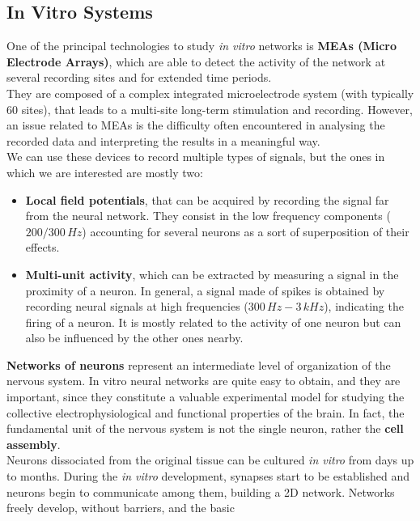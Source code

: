\subsection{In Vitro Systems}
One of the principal technologies to study \textit{in vitro} networks is
\textbf{MEAs (Micro Electrode Arrays)}, which are able to detect the
activity of the network at several recording sites and for extended time
periods.\\
They are composed of a complex integrated microelectrode system (with
typically 60 sites), that leads to a multi-site long-term stimulation and
recording.
However, an issue related to MEAs is the difficulty often encountered in
analysing the recorded data
and interpreting the results in a meaningful way.\\
We can use these devices to record multiple types of signals, but the ones
in which we are interested are mostly two:
\begin{itemize}
      \item \textbf{Local field potentials}, that can be acquired by
            recording the signal far from the neural network. They consist in the low
            frequency components (\(200/300\,Hz\)) accounting for several neurons as a sort
            of superposition of their effects.
      \item \textbf{Multi-unit activity}, which can be extracted by
            measuring a signal in the proximity of a neuron.  In general, a signal made
            of spikes is obtained by recording neural signals at high frequencies
            (\(300\,Hz-3\,kHz\)), indicating the firing of a neuron. It is mostly related to the
            activity of one neuron but can also be influenced by the other ones
            nearby.
\end{itemize}
\textbf{Networks of neurons} represent an intermediate level of
organization of the nervous system.
In vitro neural networks are quite easy to obtain, and they are important,
since they constitute a valuable experimental model for studying the
collective electrophysiological and functional properties of the brain. In
fact, the fundamental unit of the nervous system is not the single neuron,
rather the \textbf{cell assembly}.\\
Neurons dissociated from the original tissue can be cultured \textit{in vitro} from
days up to months. During the \textit{in vitro} development, synapses start to be
established and neurons begin to communicate among them, building a 2D
network. Networks freely develop, without barriers, and the basic
